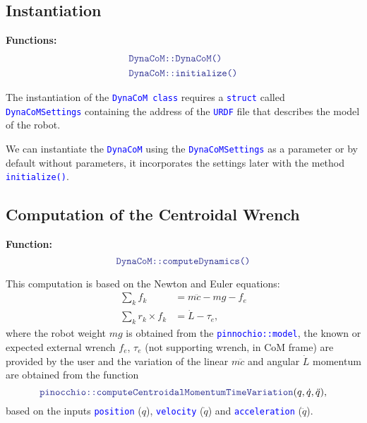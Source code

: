 \documentclass[12pt]{article}
\newcommand{\code}[2][Blue]{\textcolor{#1}{\texttt{#2}}}
\begin{document}
\subsection{Instantiation}
\hrulefill

    {\bf Functions:}
    \begin{align*}
        &\code{DynaCoM::DynaCoM()}\\
        &\code{DynaCoM::initialize()}
    \end{align*}

    The instantiation of the \code{DynaCoM class} requires a \code{struct} called \code{DynaCoMSettings} containing the address of the \code{URDF} file that describes the model of the robot.

    We can instantiate the \code{DynaCoM} using the \code{DynaCoMSettings} as a parameter or by default without parameters, it incorporates the settings later with the method \code{initialize()}.
    



\clearpage

\subsection{Computation of the Centroidal Wrench}

\hrulefill

{\bf Function:}
%
\begin{equation*}
    \code{DynaCoM::computeDynamics()}
\end{equation*}

This computation is based on the Newton and Euler equations:
%
\begin{align}
    \sum_k f_k &= m\ddot{c} - m g - f_e \\
    \sum_k r_k\times f_k &= \dot{L} -\tau_e,
\end{align}
%
where the robot weight $m g$ is obtained from the \code{pinnochio::model}, the known or expected external wrench $f_e$, $\tau_e$ (not supporting wrench, in CoM frame) are provided by the user and the variation of the linear $m\ddot{c}$ and angular $\dot{L}$ momentum are obtained from the function 
%
\begin{equation*}
    \code{pinocchio::computeCentroidalMomentumTimeVariation}(q, \dot{q}, \ddot{q}),
\end{equation*}
%
based on the inputs \code{position} ($q$), \code{velocity} ($\dot{q}$) and \code{acceleration} ($\ddot{q}$).
\end{document}
